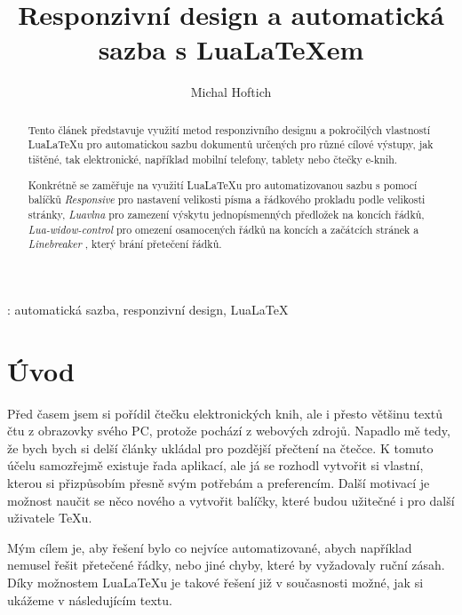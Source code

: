 \documentclass{csbulletin}
\newcommand\balicek[1]{\textit{#1}}
\newcommand\program[1]{#1}
\begin{document}
\title{Responzivní design a automatická sazba s Lua\LaTeX em}
\author{Michal Hoftich}
\maketitle

\begin{abstract}
Tento článek představuje využití metod responzivního designu a pokročilých vlastností
Lua\LaTeX u pro automatickou sazbu dokumentů určených pro různé cílové výstupy,
jak tištěné, tak elektronické, například mobilní telefony, tablety nebo čtečky e-knih.


Konkrétně se zaměřuje na využití Lua\LaTeX u pro automatizovanou
sazbu s pomocí balíčků \balicek{Responsive}\cite{responsive} pro nastavení velikosti písma a řádkového prokladu
podle velikosti stránky, \balicek{Luavlna} \cite{luavlna} pro zamezení výskytu jednopísmenných předložek
na koncích řádků, \balicek{Lua-widow-control}  \cite{lua-widow-control} pro omezení osamocených řádků na koncích a
začátcích stránek a \balicek{Linebreaker} \cite{linebreaker}, který brání přetečení řádků.

\end{abstract}
\klicovaslova: automatická sazba, responzivní design, Lua\LaTeX


\section{Úvod}

Před časem jsem si pořídil čtečku elektronických knih, ale i přesto většinu
textů čtu z obrazovky svého PC, protože pochází z webových zdrojů. 
Napadlo mě tedy, že bych bych si delší články ukládal pro pozdější
přečtení na čtečce. K tomuto účelu samozřejmě existuje řada aplikací, ale 
já se rozhodl vytvořit si vlastní, kterou si přizpůsobím přesně svým potřebám
a preferencím. Další motivací je možnost naučit se něco nového a vytvořit
balíčky, které budou užitečné i pro další uživatele \TeX u. 

Mým cílem je, aby řešení bylo co nejvíce automatizované, abych například nemusel
řešit přetečené řádky, nebo jiné chyby, které by vyžadovaly ruční zásah. 
Díky možnostem Lua\LaTeX u je takové řešení již v současnosti možné, 
jak si ukážeme v následujícím textu.


\end{document}
